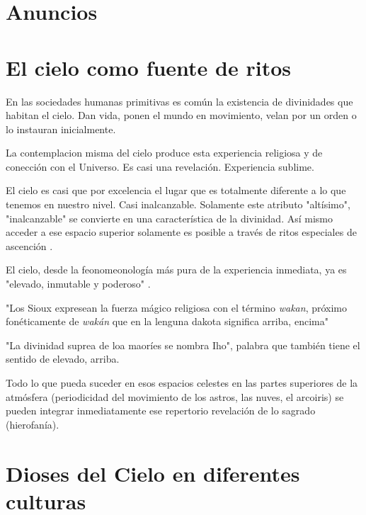 \documentclass{report}
\begin{document}
\section*{Anuncios}


\section*{El cielo como fuente de ritos}
En las sociedades humanas primitivas es com\'un la existencia de
divinidades que habitan el cielo.
Dan vida, ponen el mundo en movimiento, velan por un orden o lo
instauran inicialmente. 

La contemplacion misma del cielo produce esta experiencia religiosa y
de conecci\'on con el Universo. Es casi una revelaci\'on. Experiencia
sublime. \cite{Eliade}

El cielo es casi que por excelencia el lugar que es totalmente
diferente a lo que tenemos en nuestro nivel. Casi
inalcanzable. Solamente este atributo "alt\'isimo", "inalcanzable" se
convierte en una caracter\'istica de la divinidad. As\'i mismo acceder
a ese espacio superior solamente es posible a trav\'es de ritos
especiales de ascenci\'on \cite{Eliade}.

El cielo, desde la feonomeonolog\'ia m\'as pura de la experiencia
inmediata, ya es "elevado, inmutable y poderoso" \cite{Eliade}.

"Los Sioux expresean la fuerza m\'agico religiosa con el t\'ermino
\emph{wakan}, pr\'oximo fon\'eticamente de  \emph{wak\'an} que en la
lenguna dakota significa arriba, encima" \cite{Eliade} 

"La divinidad suprea de loa maor\'ies se nombra Iho", palabra que
tambi\'en tiene el sentido de elevado, arriba.

Todo lo que pueda suceder en esos espacios celestes en las partes
superiores de la atm\'osfera (periodicidad del movimiento de los
astros, las nuves, el arcoiris) se pueden integrar inmediatamente  ese
repertorio revelaci\'on de lo sagrado (hierofan\'ia).  


\section*{Dioses del Cielo en diferentes culturas}
\end{document}

